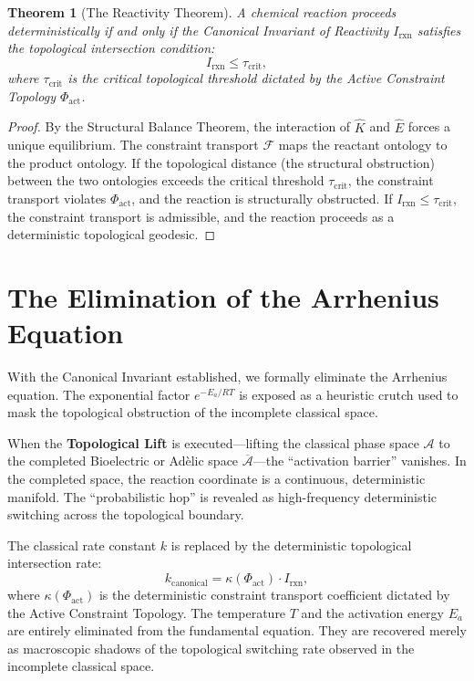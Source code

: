 \documentclass[11pt,openany]{extbook}
\theoremstyle{plain}
\newtheorem{theorem}{Theorem}[chapter]
\theoremstyle{definition}
\begin{document}
\begin{theorem}[The Reactivity Theorem]
A chemical reaction proceeds deterministically if and only if the Canonical Invariant of Reactivity $I_{\mathrm{rxn}}$ satisfies the topological intersection condition:
\[
I_{\mathrm{rxn}} \leq \tau_{\mathrm{crit}},
\]
where $\tau_{\mathrm{crit}}$ is the critical topological threshold dictated by the Active Constraint Topology $\Phi_{\mathrm{act}}$.
\end{theorem}

\begin{proof}
By the Structural Balance Theorem, the interaction of $\hat{K}$ and $\hat{E}$ forces a unique equilibrium. The constraint transport $\mathcal{F}$ maps the reactant ontology to the product ontology. If the topological distance (the structural obstruction) between the two ontologies exceeds the critical threshold $\tau_{\mathrm{crit}}$, the constraint transport violates $\Phi_{\mathrm{act}}$, and the reaction is structurally obstructed. If $I_{\mathrm{rxn}} \leq \tau_{\mathrm{crit}}$, the constraint transport is admissible, and the reaction proceeds as a deterministic topological geodesic.
\end{proof}

\section{The Elimination of the Arrhenius Equation}

With the Canonical Invariant established, we formally eliminate the Arrhenius equation. The exponential factor $e^{-E_a/RT}$ is exposed as a heuristic crutch used to mask the topological obstruction of the incomplete classical space.

When the \textbf{Topological Lift} is executed---lifting the classical phase space $\mathcal{A}$ to the completed Bioelectric or Adèlic space $\overline{\mathcal{A}}$---the ``activation barrier'' vanishes. In the completed space, the reaction coordinate is a continuous, deterministic manifold. The ``probabilistic hop'' is revealed as high-frequency deterministic switching across the topological boundary.

The classical rate constant $k$ is replaced by the deterministic topological intersection rate:
\[
k_{\mathrm{canonical}} = \kappa(\Phi_{\mathrm{act}}) \cdot I_{\mathrm{rxn}},
\]
where $\kappa(\Phi_{\mathrm{act}})$ is the deterministic constraint transport coefficient dictated by the Active Constraint Topology. The temperature $T$ and the activation energy $E_a$ are entirely eliminated from the fundamental equation. They are recovered merely as macroscopic shadows of the topological switching rate observed in the incomplete classical space.
\end{document}
